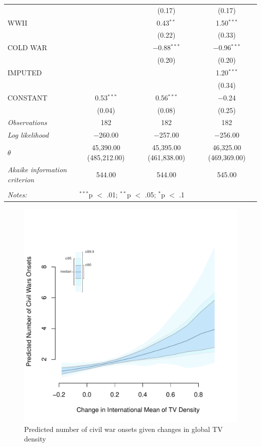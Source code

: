 \documentclass[11pt,article,oneside]{memoir}
\makeatletter
\def\maxwidth{\ifdim\Gin@nat@width>\linewidth\linewidth
\else\Gin@nat@width\fi}
\let\Oldincludegraphics\includegraphics
\renewcommand{\includegraphics}[1]{\Oldincludegraphics[width=\maxwidth]{#1}}
\makeatother
\begin{document}
\begin{table}[!htbp]
\begin{tabular}{@{\extracolsep{5pt}}lccc}
  &  & (0.17) & (0.17) \\ 
  WWII &  & 0.43$^{**}$ & 1.50$^{***}$ \\ 
  &  & (0.22) & (0.33) \\ 
  COLD WAR &  & $-$0.88$^{***}$ & $-$0.96$^{***}$ \\ 
  &  & (0.20) & (0.20) \\ 
  IMPUTED &  &  & 1.20$^{***}$ \\ 
  &  &  & (0.34) \\ 
  CONSTANT & 0.53$^{***}$ & 0.56$^{***}$ & $-$0.24 \\ 
  & (0.04) & (0.08) & (0.25) \\ 
 \textit{Observations} & 182 & 182 & 182 \\ 
\textit{Log likelihood} & $-$260.00 & $-$257.00 & $-$256.00 \\ 
$\theta$ & 45,390.00  (485,212.00) & 45,395.00  (461,838.00) & 46,325.00  (469,369.00) \\ 
\textit{Akaike information criterion} & 544.00 & 544.00 & 545.00 \\ 
\hline \\[-1.8ex] 
\textit{Notes:} & \multicolumn{3}{l}{$^{***}$p $<$ .01; $^{**}$p $<$ .05; $^{*}$p $<$ .1} \\ 
\end{tabular} 
\end{table}

\clearpage

\begin{figure} 
\includegraphics{figure/dtv_effect.pdf} 
\caption{Predicted number of civil war onsets given changes in global TV density} 
\label{myFigur} 
\end{figure}
\end{document}
